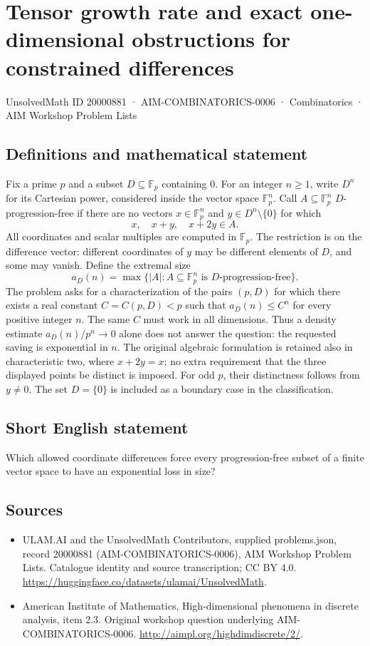 \documentclass[11pt,a4paper]{article}
\begin{document}
\section*{Tensor growth rate and exact one-dimensional obstructions for constrained differences}\label{20000881}
{\small UnsolvedMath ID 20000881 · AIM-COMBINATORICS-0006 · Combinatorics · AIM Workshop Problem Lists}
\subsection{Definitions and mathematical statement}
Fix a prime $p$ and a subset $D\subseteq\mathbb F_p$ containing $0$.
For an integer $n\ge1$, write $D^n$ for its Cartesian power, considered
inside the vector space $\mathbb F_p^n$. Call $A\subseteq\mathbb F_p^n$
$D$-progression-free if there are no vectors $x\in\mathbb F_p^n$ and
$y\in D^n\setminus\{0\}$ for which
\[
                 x,\quad x+y,\quad x+2y\in A.
\]
All coordinates and scalar multiples are computed in $\mathbb F_p$.
The restriction is on the difference vector: different coordinates of
$y$ may be different elements of $D$, and some may vanish.
Define the extremal size
\[
 a_D(n)=\max\{|A|:A\subseteq\mathbb F_p^n\text{ is }D\text{-progression-free}\}.
\]
The problem asks for a characterization of the pairs $(p,D)$ for which
there exists a real constant $C=C(p,D)<p$ such that
$a_D(n)\le C^n$ for every positive integer $n$. The same $C$ must work
in all dimensions. Thus a density estimate $a_D(n)/p^n\to0$ alone
does not answer the question: the requested saving is exponential in $n$.
The original algebraic formulation is retained also in characteristic two,
where $x+2y=x$; no extra requirement that the three displayed points be
distinct is imposed. For odd $p$, their distinctness follows from $y\ne0$.
The set $D=\{0\}$ is included as a boundary case in the classification.
\subsection{Short English statement}
Which allowed coordinate differences force every progression-free subset of a finite vector space to have an exponential loss in size?
\subsection{Sources}
\begin{itemize}
\item[S1] ULAM.AI and the UnsolvedMath Contributors, supplied problems.json, record 20000881 (AIM-COMBINATORICS-0006), AIM Workshop Problem Lists. Catalogue identity and source transcription; CC BY 4.0.
\url{https://huggingface.co/datasets/ulamai/UnsolvedMath}.
\item[S2] American Institute of Mathematics, High-dimensional phenomena in discrete analysis, item 2.3. Original workshop question underlying AIM-COMBINATORICS-0006.
\url{http://aimpl.org/highdimdiscrete/2/}.
\end{itemize}
\end{document}

